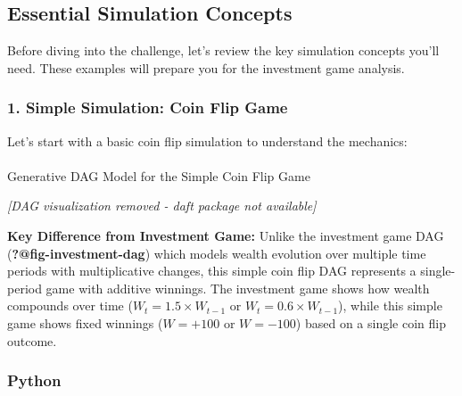 \documentclass[
  letterpaper,
  DIV=11,
  numbers=noendperiod]{scrartcl}
\makeatletter
\let\oldparagraph\paragraph
\renewcommand{\paragraph}{
    \@ifstar
      \xxxParagraphStar
      \xxxParagraphNoStar
  }
\newcommand{\xxxParagraphStar}[1]{\oldparagraph*{#1}\mbox{}}
\newcommand{\xxxParagraphNoStar}[1]{\oldparagraph{#1}\mbox{}}
\theoremstyle{definition}
\theoremstyle{remark}
\makeatother
\begin{document}
\subsection{Essential Simulation Concepts
🎯}\label{sec-simulation-concepts}

Before diving into the challenge, let's review the key simulation
concepts you'll need. These examples will prepare you for the investment
game analysis.

\subsubsection{1. Simple Simulation: Coin Flip
Game}\label{simple-simulation-coin-flip-game}

Let's start with a basic coin flip simulation to understand the
mechanics:

\paragraph{Generative DAG Model for the Simple Coin Flip
Game}\label{generative-dag-model-for-the-simple-coin-flip-game}

\emph{{[}DAG visualization removed - daft package not available{]}}

\textbf{Key Difference from Investment Game:} Unlike the investment game
DAG (\textbf{?@fig-investment-dag}) which models wealth evolution over
multiple time periods with multiplicative changes, this simple coin flip
DAG represents a single-period game with additive winnings. The
investment game shows how wealth compounds over time
(\(W_t = 1.5 \times W_{t-1}\) or \(W_t = 0.6 \times W_{t-1}\)), while
this simple game shows fixed winnings (\(W = +100\) or \(W = -100\))
based on a single coin flip outcome.

\subsubsection{Python}\label{python}
\end{document}
